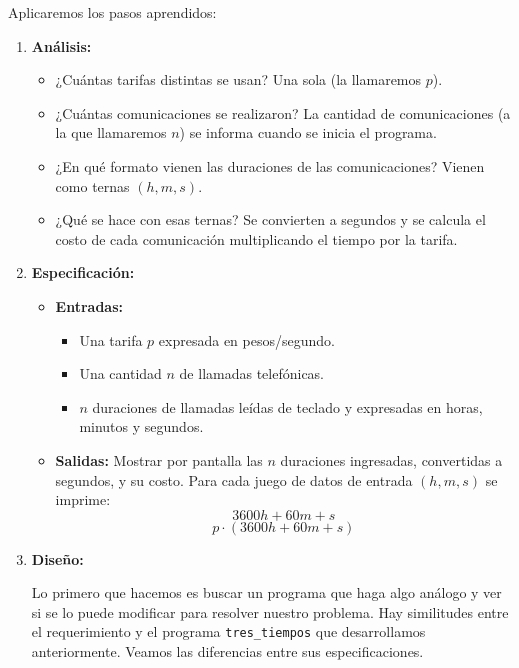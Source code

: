 \begin{solucion}
Aplicaremos los pasos aprendidos:

\begin{enumerate}

\item {\bf Análisis: }
\begin{itemize}
\item ¿Cuántas tarifas distintas se usan? Una sola (la llamaremos $p$).
\item ¿Cuántas comunicaciones se realizaron? La cantidad de comunicaciones (a
la que llamaremos $n$) se informa cuando se inicia el programa.
\item ¿En qué formato vienen las duraciones de las comunicaciones? Vienen como
    ternas $(h, m, s)$.
\item ¿Qué se hace con esas ternas? Se convierten a segundos y se calcula el costo de cada
comunicación multiplicando el tiempo por la tarifa.
\end{itemize}

\item {\bf Especificación: }
\begin{itemize}

\item {\bf Entradas: }
\begin{itemize}
\item Una tarifa $p$ expresada en pesos/segundo.
\item Una cantidad $n$ de llamadas telefónicas.
\item $n$ duraciones de llamadas leídas de teclado y expresadas en horas, minutos y segundos.
\end{itemize}

\item {\bf Salidas: } Mostrar por pantalla las $n$ duraciones ingresadas, convertidas a segundos,
y su costo.
Para cada juego de datos de entrada $(h, m, s)$ se imprime:
$$ 3600 h + 60 m + s $$
$$ p \cdot (3600 h + 60 m + s) $$
\end{itemize}

\item {\bf Diseño:}

Lo primero que hacemos es buscar un programa que haga algo análogo y ver si se
lo puede modificar para resolver nuestro problema.  Hay similitudes entre el requerimiento
y el programa \lstinline+tres_tiempos+ que desarrollamos anteriormente. 
Veamos las diferencias entre sus especificaciones.


\end{enumerate}
\end{solucion}
